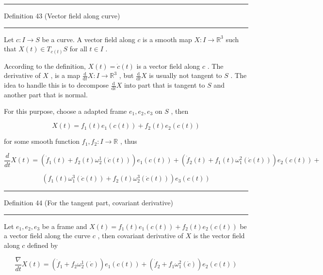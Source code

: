 \documentclass[lang=cn,a4paper,11pt,openany,twoside]{elegantbook}
\newcommand{\HRule}{\begin{center}\rule{0.9\linewidth}{0.2mm}\end{center}}
\begin{document}
\HRule

Definition 43 (Vector field along curve)

\HRule

Let \(c : I \rightarrow  S\) be a curve. A vector field along \(c\) is a smooth map \(X : I \rightarrow  {\mathbb{R}}^{3}\) such that \(X\left( t\right)  \in  {T}_{c\left( t\right) }S\) for all \(t \in  I\) .

According to the definition, \(X\left( t\right)  = \dot{c}\left( t\right)\) is a vector field along \(c\) . The derivative of \(X\) , is a map \(\frac{\mathrm{d}}{\mathrm{d}t}X : I \rightarrow  {\mathbb{R}}^{3}\) , but \(\frac{\mathrm{d}}{\mathrm{d}t}X\) is usually not tangent to \(S\) . The idea to handle this is to decompose \(\frac{\mathrm{d}}{\mathrm{d}t}X\) into part that is tangent to \(S\) and another part that is normal.

For this purpose, choose a adapted frame \({e}_{1},{e}_{2},{e}_{3}\) on \(S\) , then

\[
X\left( t\right)  = {f}_{1}\left( t\right) {e}_{1}\left( {c\left( t\right) }\right)  + {f}_{2}\left( t\right) {e}_{2}\left( {c\left( t\right) }\right)
\]

for some smooth function \({f}_{1},{f}_{2} : I \rightarrow  \mathbb{R}\) , thus

\[
\frac{d}{dt}X\left( t\right)  = \left( {{\dot{f}}_{1}\left( t\right)  + {f}_{2}\left( t\right) {\omega }_{2}^{1}\left( {\dot{c}\left( t\right) }\right) }\right) {e}_{1}\left( {c\left( t\right) }\right)  + \left( {{\dot{f}}_{2}\left( t\right)  + {f}_{1}\left( t\right) {\omega }_{1}^{2}\left( {\dot{c}\left( t\right) }\right) }\right) {e}_{2}\left( {c\left( t\right) }\right)  +
\]

\[
\left( {{f}_{1}\left( t\right) {\omega }_{1}^{3}\left( {\dot{c}\left( t\right) }\right)  + {f}_{2}\left( t\right) {\omega }_{2}^{3}\left( {\dot{c}\left( t\right) }\right) }\right) {e}_{3}\left( {c\left( t\right) }\right)
\]

\HRule

Definition 44 (For the tangent part, covariant derivative)

\HRule

Let \({e}_{1},{e}_{2},{e}_{3}\) be a frame and \(X\left( t\right)  = {f}_{1}\left( t\right) {e}_{1}\left( {c\left( t\right) }\right)  + {f}_{2}\left( t\right) {e}_{2}\left( {c\left( t\right) }\right)\) be a vector field along the curve \(c\) , then covariant derivative of \(X\) is the vector field along \(c\) defined by

\[
\frac{\nabla }{dt}X\left( t\right)  = \left( {{\dot{f}}_{1} + {f}_{2}{\omega }_{2}^{1}\left( \dot{c}\right) }\right) {e}_{1}\left( {c\left( t\right) }\right)  + \left( {{\dot{f}}_{2} + {f}_{1}{\omega }_{1}^{2}\left( \dot{c}\right) }\right) {e}_{2}\left( {c\left( t\right) }\right)
\]
\end{document}
